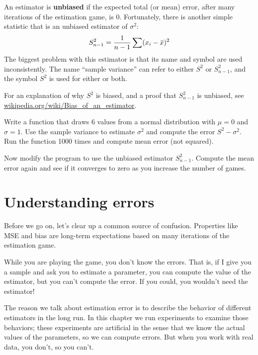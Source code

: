 \documentclass[12pt]{book}
\begin{document}


An estimator is {\bf unbiased} if the expected total (or mean) error,
after many iterations of the estimation game, is 0.
Fortunately, there is another simple statistic that is an unbiased
estimator of $\sigma^2$:
%
\[ S_{n-1}^2 = \frac{1}{n-1} \sum (x_i - \bar{x})^2 \] 
%
The biggest problem with this estimator is that its name and symbol
are used inconsistently.  The name ``sample variance'' can refer to
either $S^2$ or $S_{n-1}^2$, and the symbol $S^2$ is used
for either or both.

For an explanation of why $S^2$ is biased, and a proof that
$S_{n-1}^2$ is unbiased, see
\url{wikipedia.org/wiki/Bias_of_an_estimator}.

\begin{exercise}
Write a function that draws 6 values from a normal distribution with
$\mu=0$ and $\sigma=1$.  Use the sample variance to estimate
$\sigma^2$ and compute the error $S^2 - \sigma^2$.  Run the function 1000
times and compute mean error (not squared).


Now modify the program to use the unbiased estimator $S_{n-1}^2$.
Compute the mean error again and see if it converges to zero as you
increase the number of games.

\end{exercise}


\section{Understanding errors}


Before we go on, let's clear up a common source of confusion.
Properties like MSE and bias are long-term expectations based on
many iterations of the estimation game.

While you are playing the game, you don't know the errors.  That is,
if I give you a sample and ask you to estimate a parameter, you
can compute the value of the estimator, but you can't compute the
error.  If you could, you wouldn't need the estimator!

The reason we talk about estimation error is to describe the behavior
of different estimators in the long run.  In this chapter we run
experiments to examine those behaviors; these experiments are
artificial in the sense that we know the actual values of the
parameters, so we can compute errors.  But when you work with
real data, you don't, so you can't.
\end{document}
